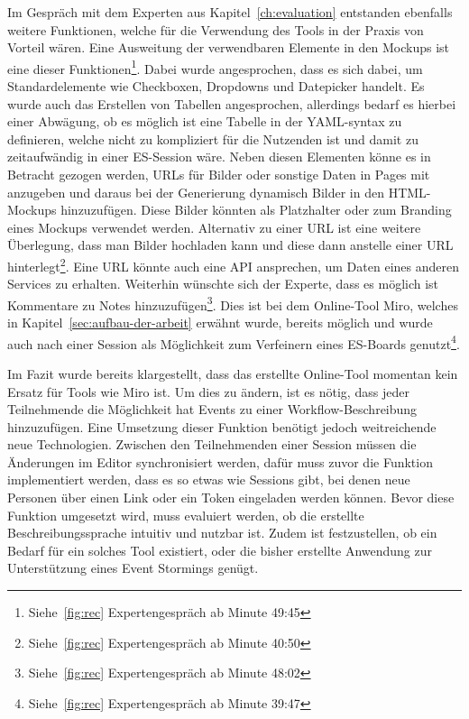 Im Gespräch mit dem Experten aus Kapitel~\ref{ch:evaluation} entstanden ebenfalls weitere Funktionen, welche für die Verwendung des Tools in der Praxis von Vorteil wären.
Eine Ausweitung der verwendbaren Elemente in den Mockups ist eine dieser Funktionen\footnote{Siehe~\ref{fig:rec} Expertengespräch ab Minute  49:45}.
Dabei wurde angesprochen, dass es sich dabei, um Standardelemente wie Checkboxen, Dropdowns und Datepicker handelt.
Es wurde auch das Erstellen von Tabellen angesprochen, allerdings bedarf es hierbei einer Abwägung, ob es möglich ist eine Tabelle in der YAML-syntax zu definieren,
welche nicht zu kompliziert für die Nutzenden ist und damit zu zeitaufwändig in einer \ac{ES}-Session wäre.
Neben diesen Elementen könne es in Betracht gezogen werden, URLs für Bilder oder sonstige Daten in Pages mit anzugeben und
daraus bei der Generierung dynamisch Bilder in den HTML-Mockups hinzuzufügen.
Diese Bilder könnten als Platzhalter oder zum Branding eines Mockups verwendet werden.
Alternativ zu einer URL ist eine weitere Überlegung, dass man Bilder hochladen kann und diese dann anstelle einer URL hinterlegt\footnote{Siehe~\ref{fig:rec} Expertengespräch ab Minute  40:50}.
Eine URL könnte auch eine API ansprechen, um Daten eines anderen Services zu erhalten.
Weiterhin wünschte sich der Experte, dass es möglich ist Kommentare zu Notes hinzuzufügen\footnote{Siehe~\ref{fig:rec} Expertengespräch ab Minute  48:02}.
Dies ist bei dem Online-Tool Miro, welches in Kapitel~\ref{sec:aufbau-der-arbeit} erwähnt wurde, bereits möglich und wurde auch nach einer Session als Möglichkeit
zum Verfeinern eines \ac{ES}-Boards genutzt\footnote{Siehe~\ref{fig:rec} Expertengespräch ab Minute  39:47}.

Im Fazit wurde bereits klargestellt, dass das erstellte Online-Tool momentan kein Ersatz für Tools wie Miro ist.
Um dies zu ändern, ist es nötig, dass jeder Teilnehmende die Möglichkeit hat Events zu einer Workflow-Beschreibung hinzuzufügen.
Eine Umsetzung dieser Funktion benötigt jedoch weitreichende neue Technologien.
Zwischen den Teilnehmenden einer Session müssen die Änderungen im Editor synchronisiert werden, dafür muss zuvor die Funktion
implementiert werden, dass es so etwas wie Sessions gibt, bei denen neue Personen über einen Link oder ein Token eingeladen werden können.
Bevor diese Funktion umgesetzt wird, muss evaluiert werden, ob die erstellte Beschreibungssprache intuitiv und nutzbar ist.
Zudem ist festzustellen, ob ein Bedarf für ein solches Tool existiert, oder die bisher erstellte Anwendung zur Unterstützung eines Event Stormings genügt.

